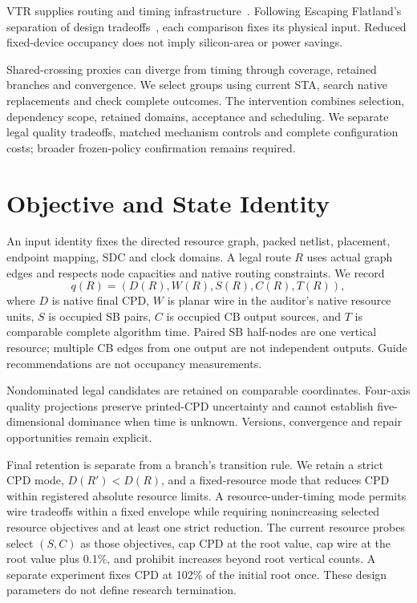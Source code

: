\documentclass[conference,10pt]{IEEEtran}
\begin{document}
VTR supplies routing and timing infrastructure~\cite{vtr9paper}. Following Escaping Flatland's separation of design tradeoffs~\cite{flatland}, each comparison fixes its physical input. Reduced fixed-device occupancy does not imply silicon-area or power savings.

Shared-crossing proxies can diverge from timing through coverage, retained branches and convergence. We select groups using current STA, search native replacements and check complete outcomes. The intervention combines selection, dependency scope, retained domains, acceptance and scheduling. We separate legal quality tradeoffs, matched mechanism controls and complete configuration costs; broader frozen-policy confirmation remains required.

\section{Objective and State Identity}
An input identity fixes the directed resource graph, packed netlist, placement, endpoint mapping, SDC and clock domains. A legal route $R$ uses actual graph edges and respects node capacities and native routing constraints. We record
\begin{equation}
 q(R)=(D(R),W(R),S(R),C(R),T(R)),
\end{equation}
where $D$ is native final CPD, $W$ is planar wire in the auditor's native resource units, $S$ is occupied SB pairs, $C$ is occupied CB output sources, and $T$ is comparable complete algorithm time. Paired SB half-nodes are one vertical resource; multiple CB edges from one output are not independent outputs. Guide recommendations are not occupancy measurements.

Nondominated legal candidates are retained on comparable coordinates. Four-axis quality projections preserve printed-CPD uncertainty and cannot establish five-dimensional dominance when time is unknown. Versions, convergence and repair opportunities remain explicit.

Final retention is separate from a branch's transition rule. We retain a strict CPD mode, $D(R')<D(R)$, and a fixed-resource mode that reduces CPD within registered absolute resource limits. A resource-under-timing mode permits wire tradeoffs within a fixed envelope while requiring nonincreasing selected resource objectives and at least one strict reduction. The current resource probes select $(S,C)$ as those objectives, cap CPD at the root value, cap wire at the root value plus 0.1\%, and prohibit increases beyond root vertical counts. A separate experiment fixes CPD at 102\% of the initial root once. These design parameters do not define research termination.
\end{document}
